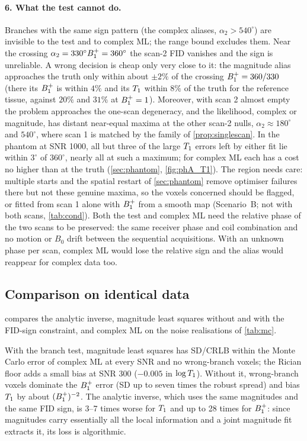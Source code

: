 \paragraph{6. What the test cannot do.} Branches with the same sign pattern (the complex
aliases, $\alpha_2>540^\circ$) are invisible to the test and to complex ML; the range bound excludes
them. Near the crossing $\alpha_2=330^\circ B_1^{+}=360^\circ$ the scan-2 FID vanishes and the sign is
unreliable. A wrong decision is cheap only very close to it: the magnitude alias approaches the
truth only within about $\pm2\%$ of the crossing $B_1^{+}=360/330$ (there its $B_1^{+}$ is within $4\%$ and its
$T_1$ within $8\%$ of the truth for the reference tissue, against $20\%$ and $31\%$ at $B_1^{+}=1$). Moreover,
with scan 2 almost empty the problem approaches the one-scan degeneracy, and the likelihood,
complex or magnitude, has distant near-equal maxima at the other scan-2 nulls, $\alpha_2\approx180^\circ$ and
$540^\circ$, where scan 1 is matched by the family of \cref{prop:singlescan}. In the phantom at SNR
1000, all but three of the large $T_1$ errors left by either fit lie within $3^\circ$ of $360^\circ$, nearly
all at such a maximum; for complex ML each has a cost no higher than at the truth
(\cref{sec:phantom}, \cref{fig:phA_T1}). The region needs care: multiple starts and the spatial
restart of \cref{sec:phantom} remove optimiser failures there but not these genuine maxima, so
the voxels concerned should be flagged, or fitted from scan 1 alone with $B_1^{+}$ from a smooth map
(Scenario~B; not with both scans, \cref{tab:cond}). Both the test and complex ML need the relative
phase of the two scans to be preserved: the same receiver phase and coil combination and no motion
or $B_0$ drift between the sequential acquisitions. With an unknown phase per scan, complex ML would
lose the relative sign and the alias would reappear for complex data too.

\subsection{Comparison on identical data}

 compares the analytic inverse, magnitude least squares without and with the
FID-sign constraint, and complex ML on the noise realisations of \cref{tab:mc}.



With the branch test, magnitude least squares has SD/CRLB within the Monte Carlo error of
complex ML at every SNR and no wrong-branch voxels; the Rician floor adds a small bias at SNR
300 ($-0.005$ in $\log T_1$). Without it, wrong-branch voxels dominate the $B_1^{+}$ error (SD up to
seven times the robust spread) and bias $T_1$ by about $(B_1^{+})^{-2}$. The analytic inverse, which uses
the same magnitudes and the same FID sign, is 3--7 times worse for $T_1$ and up to 28 times
for $B_1^{+}$: since magnitudes carry essentially all the local information and a joint magnitude
fit extracts it, its loss is algorithmic.
